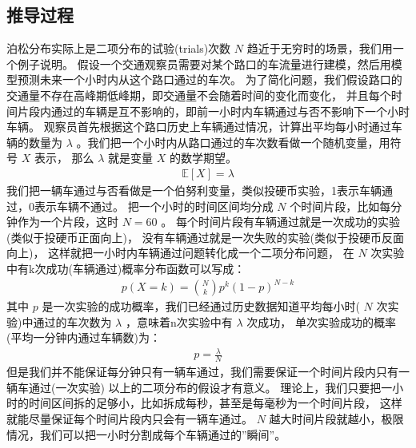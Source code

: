 \documentclass[letterpaper,10pt,english]{sphinxmanual}
\begin{document}
\subsection{推导过程}
\label{\detokenize{_u6cca_u677e_u6a21_u578b/content:id2}}
泊松分布实际上是二项分布的试验(trials)次数 \(N\) 趋近于无穷时的场景，我们用一个例子说明。
假设一个交通观察员需要对某个路口的车流量进行建模，然后用模型预测未来一个小时内从这个路口通过的车次。
为了简化问题，我们假设路口的交通量不存在高峰期低峰期，即交通量不会随着时间的变化而变化，
并且每个时间片段内通过的车辆是互不影响的，即前一小时内车辆通过与否不影响下一个小时车辆。
观察员首先根据这个路口历史上车辆通过情况，计算出平均每小时通过车辆的数量为
\(\lambda\)
。我们把一个小时内从路口通过的车次数看做一个随机变量，用符号 \(X\) 表示，
那么 \(\lambda\) 就是变量 \(X\) 的数学期望。
\begin{equation}\label{equation:泊松模型/content:泊松模型/content:0}
\begin{split}\mathbb{E}[X] = \lambda\end{split}
\end{equation}
我们把一辆车通过与否看做是一个伯努利变量，类似投硬币实验，1表示车辆通过，0表示车辆不通过。
把一个小时的时间区间均分成 \(N\) 个时间片段，比如每分钟作为一个片段，这时 \(N=60\) 。
每个时间片段有车辆通过就是一次成功的实验(类似于投硬币正面向上)，
没有车辆通过就是一次失败的实验(类似于投硬币反面向上)，
这样就把一小时内车辆通过问题转化成一个二项分布问题，
在 \(N\) 次实验中有k次成功(车辆通过)概率分布函数可以写成：
\begin{equation}\label{equation:泊松模型/content:eq_poisson_201}
\begin{split}p(X=k) = \binom{N}{k} p^k \left ( 1-p  \right )^{N-k}\end{split}
\end{equation}
其中 \(p\) 是一次实验的成功概率，我们已经通过历史数据知道平均每小时( \(N\) 次实验)中通过的车次数为
\(\lambda\)
，意味着n次实验中有 \(\lambda\) 次成功，
单次实验成功的概率(平均一分钟内通过车辆数)为：
\begin{equation}\label{equation:泊松模型/content:泊松模型/content:1}
\begin{split}p = \frac{\lambda}{N}\end{split}
\end{equation}
但是我们并不能保证每分钟只有一辆车通过，我们需要保证一个时间片段内只有一辆车通过(一次实验)
以上的二项分布的假设才有意义。
理论上，我们只要把一小时的时间区间拆的足够小，比如拆成每秒，甚至是每毫秒为一个时间片段，
这样就能尽量保证每个时间片段内只会有一辆车通过。
\(N\) 越大时间片段就越小，极限情况，我们可以把一小时分割成每个车辆通过的”瞬间”。
\end{document}
